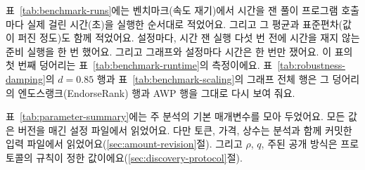
표~\ref{tab:benchmark-runs}에는 벤치마크(속도 재기)에서 시간을 잰 풀이 프로그램 호출마다 실제 걸린 시간(초)을 실행한 순서대로 적었어요. 그리고 그 평균과 표준편차(값이 퍼진 정도)도 함께 적었어요. 설정마다, 시간 잰 실행 다섯 번 전에 시간을 재지 않는 준비 실행을 한 번 했어요. 그리고 그래프와 설정마다 시간은 한 번만 쟀어요. 이 표의 첫 번째 덩어리는 표~\ref{tab:benchmark-runtime}의 측정이에요. 표~\ref{tab:robustness-damping}의 $d=0.85$ 행과 표~\ref{tab:benchmark-scaling}의 그래프 전체 행은 그 덩어리의 엔도스랭크(EndorseRank) 행과 AWP 행을 그대로 다시 보여 줘요.




표~\ref{tab:parameter-summary}에는 주 분석의 기본 매개변수를 모아 두었어요. 모든 값은 버전을 매긴 설정 파일에서 읽었어요. 다만 토큰, 가격, 상수는 분석과 함께 커밋한 입력 파일에서 읽었어요(\ref{sec:amount-revision}절). 그리고 $\rho$, $q$, 주된 공개 방식은 프로토콜의 규칙이 정한 값이에요(\ref{sec:discovery-protocol}절).

